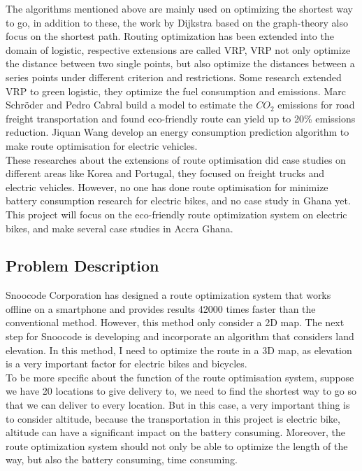\documentclass[project-plan]{report-template}
\begin{document}
The algorithms mentioned above are mainly used on optimizing the shortest way to go, in addition to these, the work by Dijkstra based on the graph-theory also focus on the shortest path.
Routing optimization has been extended into the domain of logistic, respective extensions are called VRP\cite{BRAEKERS2016300}, VRP not only optimize the distance between two single points,
but also optimize the distances between a series points under different criterion and restrictions. 
Some research extended VRP to green logistic, they optimize the fuel consumption and emissions\cite{green_vehicle}.
Marc Schröder and Pedro Cabral\cite{article} build a model to estimate the $CO_2$ emissions for road freight transportation and found eco-friendly route can yield up to 20\% emissions reduction.
Jiquan Wang\cite{battery_predict} develop an energy consumption prediction algorithm to make route optimisation for electric vehicles.\\

These researches about the extensions of route optimisation did case studies on different areas like Korea and Portugal, they focused on freight trucks and electric vehicles.
However, no one has done route optimisation for minimize battery consumption research for electric bikes, and no case study in Ghana yet. 
This project will focus on the eco-friendly route optimization system on electric bikes, and make several case studies in Accra Ghana.

\subsection {Problem Description}
Snoocode Corporation has designed a route optimization system that works offline on a smartphone and provides 
results 42000 times faster than the conventional method. However, this method only consider a 2D map.
The next step for Snoocode is developing and incorporate an algorithm that considers land elevation. 
In this method, I need to optimize the route in a 3D map, as elevation is a very important factor for 
electric bikes and bicycles. \\

To be more specific about the function of the route optimisation system, suppose we have 20 locations to
give delivery to, we need to find the shortest way to go so that we can deliver to every location. 
But in this case, a very important thing is to consider altitude, 
because the transportation in this project is electric bike, altitude can have a significant impact on the battery consuming.
Moreover, the route optimization system should not only be able to optimize the length of the way, but also the battery consuming, time consuming.\\
\end{document}
